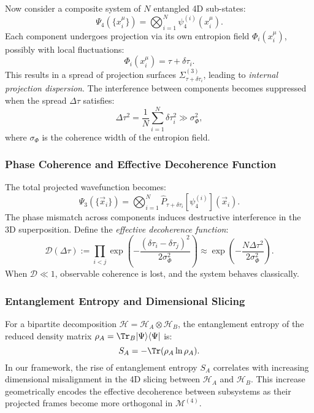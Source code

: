 \documentclass[12pt]{article}
\begin{document}
Now consider a composite system of $N$ entangled 4D sub-states:
\begin{equation}
\label{eq:composite_wavefunction}
\Psi_4(\{x^\mu_i\}) = \bigotimes_{i=1}^{N} \psi_4^{(i)}(x^\mu_i).
\end{equation}
Each component undergoes projection via its own entropion field $\Phi_i(x^\mu_i)$, possibly with local fluctuations:
\begin{equation}
\label{eq:local_projection}
\Phi_i(x^\mu_i) = \tau + \delta\tau_i.
\end{equation}
This results in a spread of projection surfaces $\Sigma^{(3)}_{\tau + \delta\tau_i}$, leading to \emph{internal projection dispersion}. The interference between components becomes suppressed when the spread $\Delta\tau$ satisfies:
\begin{equation}
\label{eq:dispersion_condition}
\Delta\tau^2 = \frac{1}{N} \sum_{i=1}^N \delta\tau_i^2 \gg \sigma_{\Phi}^2,
\end{equation}
where $\sigma_\Phi$ is the coherence width of the entropion field.

\subsubsection*{Phase Coherence and Effective Decoherence Function}

The total projected wavefunction becomes:
\begin{equation}
\label{eq:macro_projection}
\Psi_3(\{\vec{x}_i\}) = \bigotimes_{i=1}^{N} \hat{P}_{\tau + \delta\tau_i}[\psi_4^{(i)}](\vec{x}_i).
\end{equation}
The phase mismatch across components induces destructive interference in the 3D superposition. Define the \emph{effective decoherence function}:
\begin{equation}
\label{eq:decoherence_function}
\mathcal{D}(\Delta\tau) := \prod_{i<j} \exp\left(-\frac{(\delta\tau_i - \delta\tau_j)^2}{2\sigma_\Phi^2}\right) \approx \exp\left(-\frac{N\Delta\tau^2}{2\sigma_\Phi^2}\right).
\end{equation}
When $\mathcal{D} \ll 1$, observable coherence is lost, and the system behaves classically.

\subsubsection*{Entanglement Entropy and Dimensional Slicing}

For a bipartite decomposition $\mathcal{H} = \mathcal{H}_A \otimes \mathcal{H}_B$, the entanglement entropy of the reduced density matrix $\rho_A = \Tr_B |\Psi\rangle\langle\Psi|$ is:
\begin{equation}
\label{eq:entanglement_entropy}
S_A = -\Tr(\rho_A \ln \rho_A).
\end{equation}
In our framework, the rise of entanglement entropy $S_A$ correlates with increasing dimensional misalignment in the 4D slicing between $\mathcal{H}_A$ and $\mathcal{H}_B$. This increase geometrically encodes the effective decoherence between subsystems as their projected frames become more orthogonal in $\mathcal{M}^{(4)}$.
\end{document}
